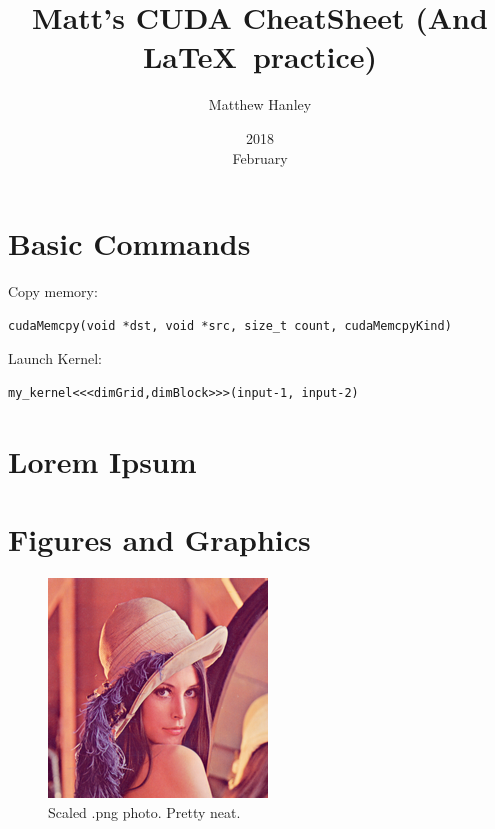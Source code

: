 \documentclass{article}
\title{Matt's CUDA CheatSheet (And \LaTeX\ practice)}
\date{2018\\ February}
\author{Matthew Hanley}
\begin{document}
\maketitle
\section{Basic Commands}

Copy memory:
\begin{lstlisting}
cudaMemcpy(void *dst, void *src, size_t count, cudaMemcpyKind)
\end{lstlisting}

Launch Kernel:
\begin{lstlisting}
my_kernel<<<dimGrid,dimBlock>>>(input-1, input-2)
\end{lstlisting}

\section{Lorem Ipsum}
\blindtext

\section{Figures and Graphics}
\blindtext
\begin{figure}[bh]
  \centering
  \includegraphics[scale=0.5]{girl}
  \caption{Scaled .png photo. Pretty neat.}
\end{figure}
\end{document}
